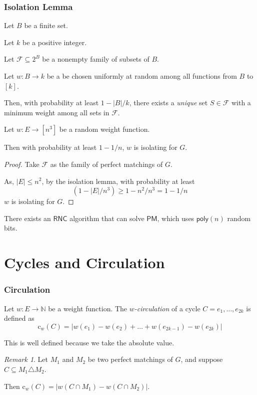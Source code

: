 \documentclass{beamer}
\theoremstyle{remark}
\newtheorem{remark}{Remark}
\newcommand{\nn}{\mathbb{N}}
\newcommand{\cl}{\text{c}}
\newcommand{\dpm}{\mathsf{PM}}
\begin{document}
\begin{frame}
  \frametitle{Isolation Lemma}
  \begin{lemma}
    Let $B$ be a finite set.

    Let $k$ be a positive integer.

    Let $\mathcal{F} \subseteq 2^B$ be a nonempty family of
    subsets of $B$.

    Let $w : B \to k$ be a be chosen uniformly at random
    among all functions from $B$ to $[k]$.

    Then, with probability at least $1 - |B|/k$,
    there exists a \emph{unique} set $S \in \mathcal{F}$
    with a minimum weight among all sets in $\mathcal{F}$.
  \end{lemma}
\end{frame}
\begin{frame}
  \begin{corollary}
    Let $w : E \to [n^3]$ be a random weight function.

    Then with probability at least $1 - 1/n$, $w$ is isolating for $G$.
  \end{corollary}

  \begin{proof}
    Take $\mathcal{F}$ as the family of perfect matchings of $G$.


    As, $|E| \le n^2$, by the isolation lemma, with probability at least
    \[
      (1 - |E|/n^3) \ge 1 - n^2/n^3 = 1 - 1/n
    \]
    $w$ is isolating for $G$.
  \end{proof}

  \begin{corollary}
    There exists an $\mathsf{RNC}$ algorithm that can solve $\dpm$,
    which uses $\mathsf{poly}(n)$ random bits.
  \end{corollary}
\end{frame}

\section{Cycles and Circulation}

\begin{frame}
  \frametitle{Circulation}
  \begin{definition}
    Let $w : E \to \nn$ be a weight function.
    The \emph{$w$-circulation} of a cycle $C = {e_1, \ldots, e_{2k}}$ is defined as
    \[
      \cl_w(C) = |w(e_1) - w(e_2) + \ldots + w(e_{2k - 1}) - w(e_{2k})|
    \]

    This is well defined because we take the absolute value.
  \end{definition}

  \begin{remark}
    Let $M_1$ and $M_2$ be two perfect matchings of $G$,
    and suppose $C\subseteq M_1 \triangle M_2$.

    Then $\cl_w(C) = |w(C \cap M_1) - w(C \cap M_2)|$.
  \end{remark}
\end{frame}
\end{document}
